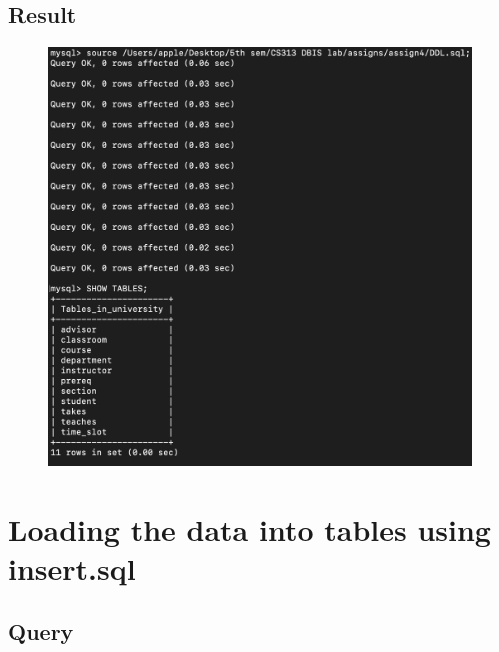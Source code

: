 \documentclass[12pt]{article}
\begin{document}
\subsection{Result}
\begin{figure}[!hbt]
    \centering
    \includegraphics[scale=0.55]{screenshots/4.png}
    \label{fig:my_label1}
\end{figure}

\newpage
\section{Loading the data into tables using insert.sql}

\subsection{Query}
\end{document}
